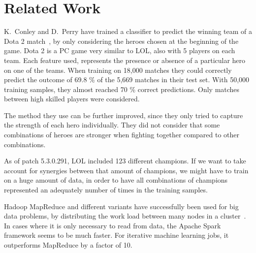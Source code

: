 \section{Related Work}\label{sec:relatedwork}

K.\ Conley and D.\ Perry have trained a classifier to predict the winning team of a Dota 2 match~\cite{dota2article}, by only considering the heroes chosen at the beginning of the game. Dota 2 is a PC game very similar to LOL, also with 5 players on each team.
Each feature used, represents the presence or absence of a particular hero on one of the teams.
When training on 18,000 matches they could correctly predict the outcome of 69.8 \% of the 5,669 matches in their test set.
With 50,000 training samples, they almost reached 70 \% correct predictions. Only matches between high skilled players were considered.

The method they use can be further improved, since they only tried to capture the strength of each hero individually.
They did not consider that some combinations of heroes are stronger when fighting together compared to other combinations.

As of patch 5.3.0.291, LOL included 123 different champions. If we want to take account for synergies between that amount of champions, we might have to train on a huge amount of data, in order to have all combinations of champions represented an adequately number of times in the training samples. %

Hadoop MapReduce and different variants have successfully been used for big data problems, by distributing the work load between many nodes in a cluster~\cite{ApacheSpark}.
In cases where it is only necessary to read from data, the Apache Spark framework seems to be much faster.
For iterative machine learning jobs, it outperforms MapReduce by a factor of 10.

